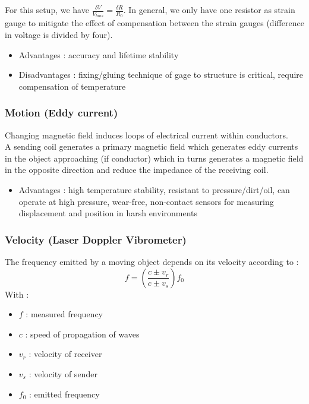 \documentclass[../main.tex]{subfiles}
\begin{document}
For this setup, we have $\frac{\delta V}{V_{bias}} = \frac{\delta R}{R_0}$. In general, we only have one resistor as strain gauge to mitigate the effect of compensation between the strain gauges (difference in voltage is divided by four).\\

\begin{itemize}
    \item Advantages : accuracy and lifetime stability\\
    \item Disadvantages : fixing/gluing technique of gage to structure is critical, require compensation of temperature\\
\end{itemize}

\subsubsection{Motion (Eddy current)}
Changing magnetic field induces loops of electrical current within conductors.\\
A sending coil generates a primary magnetic field which generates eddy currents in the object approaching (if conductor) which in turns generates a magnetic field in the opposite direction and reduce the impedance of the receiving coil.\\

\begin{itemize}
    \item Advantages : high temperature stability, resistant to pressure/dirt/oil, can operate at high pressure, wear-free, non-contact sensors for measuring displacement and position in harsh environments\\
\end{itemize}

\subsubsection{Velocity (Laser Doppler Vibrometer)}
The frequency emitted by a moving object depends on its velocity according to :\begin{equation}
    f = (\frac{c\pm v_r}{c\pm v_s}) f_0
\end{equation}
With : \begin{itemize}
    \item $f$ : measured frequency\\
    \item $c$ : speed of propagation of waves\\
    \item $v_r$ : velocity of receiver\\
    \item $v_s$ : velocity of sender\\
    \item $f_0$ : emitted frequency\\
\end{itemize}
\end{document}
